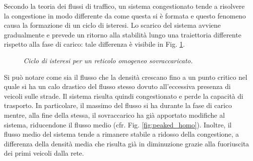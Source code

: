 \documentclass[../main.tex]{subfiles}
\begin{document}
Secondo la teoria dei flussi di traffico, un sistema congestionato tende a risolvere la congestione in modo differente da come questa si \`e formata e questo fenomeno causa la formazione di un ciclo di isteresi.
Lo scarico del sistema avviene gradualmente e prevede un ritorno alla stabilit\`a lungo una traiettoria differente rispetto alla fase di carico: tale differenza \`e visibile in Fig. \ref{fig:hysteresys_peaked_homo}.
\begin{figure}[H]
    \hfill
    \caption[Isteresi per un reticolo omogeneo sovraccaricato]{\emph{Ciclo di isteresi per un reticolo omogeneo sovraccaricato.}}
    \label{fig:hysteresys_peaked_homo}
\end{figure}
Si pu\`o notare come sia il flusso che la densit\`a crescano fino a un punto critico nel quale si ha un calo drastico del flusso stesso dovuto all'eccessiva presenza di veicoli sulle strade.
Il sistema risulta quindi congestionato e perde la capacit\`a di trasporto.
In particolare, il massimo del flusso si ha durante la fase di carico mentre, alla fine della stessa, il sovraccarico ha gi\`a apportato modifiche al sistema, riducendone il flusso medio (cfr. Fig. \ref{fig:peaked_homo}).
Inoltre, il flusso medio del sistema tende a rimanere stabile a ridosso della congestione, a differenza della densit\`a media che risulta gi\`a in diminuzione grazie alla fuoriuscita dei primi veicoli dalla rete.
\end{document}
